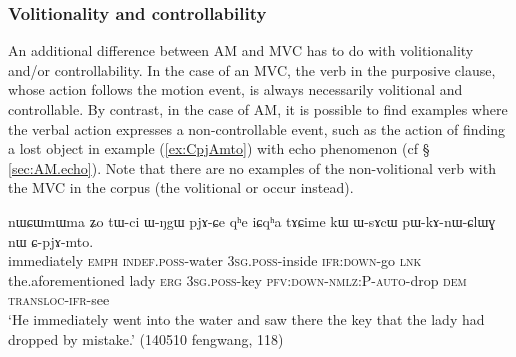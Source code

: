\subsubsection{Volitionality and controllability}
An additional difference between AM and MVC has to do with volitionality and/or controllability. In the case of an MVC, the verb in the purposive clause, whose action follows the motion event, is always necessarily volitional and controllable. By contrast, in the case of AM, it is possible to find examples where the verbal action expresses a non-controllable event, such as the action of finding a lost object in example (\ref{ex:CpjAmto}) with echo phenomenon (cf § \ref{sec:AM.echo}). Note that there are no examples of the non-volitional verb  with the MVC in the corpus (the volitional  or  occur  instead). 

\begin{exe}
\ex  \label{ex:CpjAmto}
\gll  nɯɕɯmɯma ʑo tɯ-ci ɯ-ŋgɯ pjɤ-ɕe qʰe iɕqʰa tɤɕime kɯ ɯ-sɤcɯ pɯ-kɤ-nɯ-ɕlɯɣ nɯ ɕ-pjɤ-mto. \\
immediately \textsc{emph} \textsc{indef}.\textsc{poss}-water \textsc{3sg}.\textsc{poss}-inside \textsc{ifr}:\textsc{down}-go \textsc{lnk} the.aforementioned lady \textsc{erg} \textsc{3sg}.\textsc{poss}-key \textsc{pfv}:\textsc{down}-\textsc{nmlz}:P-\textsc{auto}-drop \textsc{dem} \textsc{transloc}-\textsc{ifr}-see \\
\glt `He immediately went into the water and saw there the key that the lady had dropped by mistake.' (140510 fengwang, 118)
\end{exe}

